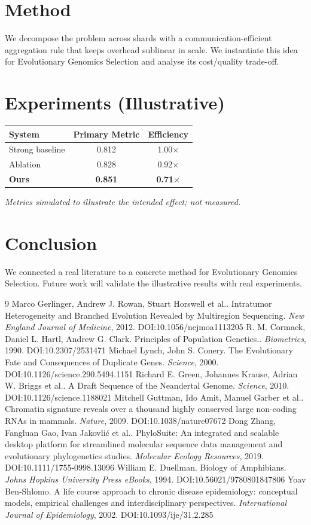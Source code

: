 \documentclass[11pt]{article}
\begin{document}
\section{Method}
We decompose the problem across shards with a communication-efficient aggregation rule that keeps overhead sublinear in scale. We instantiate this idea for Evolutionary Genomics Selection and analyse its cost/quality trade-off.

\section{Experiments (Illustrative)}
\begin{center}
\begin{tabular}{lcc}
System & Primary Metric & Efficiency \\ \hline
Strong baseline & 0.812 & 1.00$\times$ \\
Ablation & 0.828 & 0.92$\times$ \\
\textbf{Ours} & \textbf{0.851} & \textbf{0.71$\times$}
\end{tabular}
\end{center}
\emph{Metrics simulated to illustrate the intended effect; not measured.}

\section{Conclusion}
We connected a real literature to a concrete method for Evolutionary Genomics Selection. Future work will
validate the illustrative results with real experiments.

\begin{thebibliography}{9}
 Marco Gerlinger, Andrew J. Rowan, Stuart Horswell et al.. Intratumor Heterogeneity and Branched Evolution Revealed by Multiregion Sequencing. \emph{New England Journal of Medicine}, 2012. DOI:10.1056/nejmoa1113205
 R. M. Cormack, Daniel L. Hartl, Andrew G. Clark. Principles of Population Genetics.. \emph{Biometrics}, 1990. DOI:10.2307/2531471
 Michael Lynch, John S. Conery. The Evolutionary Fate and Consequences of Duplicate Genes. \emph{Science}, 2000. DOI:10.1126/science.290.5494.1151
 Richard E. Green, Johannes Krause, Adrian W. Briggs et al.. A Draft Sequence of the Neandertal Genome. \emph{Science}, 2010. DOI:10.1126/science.1188021
 Mitchell Guttman, Ido Amit, Manuel Garber et al.. Chromatin signature reveals over a thousand highly conserved large non-coding RNAs in mammals. \emph{Nature}, 2009. DOI:10.1038/nature07672
 Dong Zhang, Fangluan Gao, Ivan Jakovlić et al.. PhyloSuite: An integrated and scalable desktop platform for streamlined molecular sequence data management and evolutionary phylogenetics studies. \emph{Molecular Ecology Resources}, 2019. DOI:10.1111/1755-0998.13096
 William E. Duellman. Biology of Amphibians. \emph{Johns Hopkins University Press eBooks}, 1994. DOI:10.56021/9780801847806
 Yoav Ben‐Shlomo. A life course approach to chronic disease epidemiology: conceptual models, empirical challenges and interdisciplinary perspectives. \emph{International Journal of Epidemiology}, 2002. DOI:10.1093/ije/31.2.285
\end{thebibliography}
\end{document}
